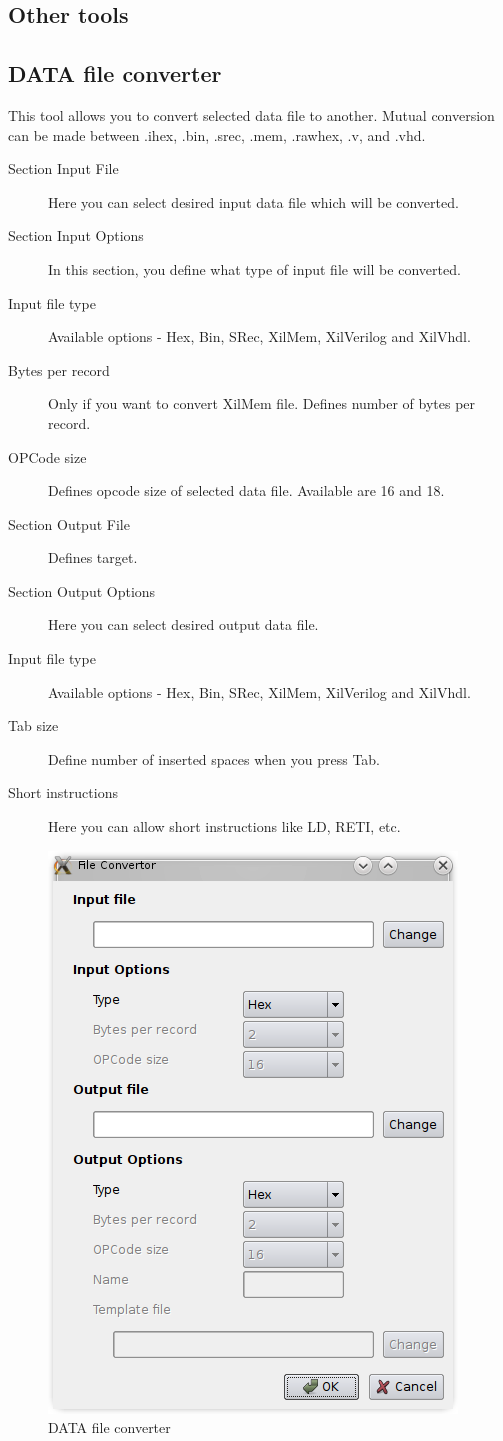 \subsection{Other tools}

\subsection{DATA file converter}
    This tool allows you to convert selected data file to another. Mutual conversion can be made between .ihex, .bin,
    .srec, .mem, .rawhex, .v, and .vhd.
    \begin{description}
        \item[Section Input File] Here you can select desired input data file which will be converted.
        \item[Section Input Options] In this section, you define what type of input file will be converted.
        \item[Input file type] Available options - Hex, Bin, SRec, XilMem, XilVerilog and XilVhdl.
        \item[Bytes per record] Only if you want to convert XilMem file. Defines number of bytes per record.
        \item[OPCode size] Defines opcode size of selected data file. Available are 16 and 18.
        \item[Section Output File] Defines target.
        \item[Section Output Options] Here you can select desired output data file.
        \item[Input file type] Available options - Hex, Bin, SRec, XilMem, XilVerilog and XilVhdl.
        \item[Tab size]  Define number of inserted spaces when you press Tab.
        \item[Short instructions] Here you can allow short instructions like LD, RETI, etc.
    \end{description}

    \begin{figure}[h]
        \centering{}
        \includegraphics[width=.5\textwidth]{img/DATA_convertor.png}
        \caption{DATA file converter}
    \end{figure}

